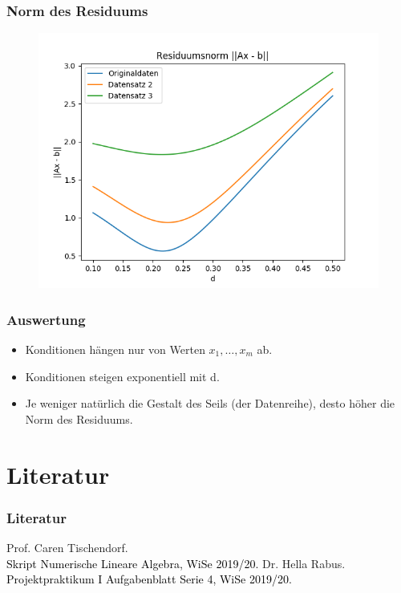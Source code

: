 \documentclass[a4paper, 11pt]{beamer}
\begin{document}
\begin{frame}
    \frametitle{Norm des Residuums}

    \begin{figure}
        \centering
        \includegraphics[scale=0.6]{residuumsnorm}
    \end{figure}
\end{frame}


\begin{frame}
    \frametitle{Auswertung}

    \begin{itemize}
        \item Konditionen hängen nur von Werten $x_1,\hdots,x_m$ ab.
        \item Konditionen steigen exponentiell mit d.
        \item Je weniger natürlich die Gestalt des Seils (der Datenreihe), desto höher die Norm des Residuums.
    \end{itemize}
\end{frame}


\section{Literatur}

\begin{frame}
    \frametitle{Literatur}

    \begin{thebibliography}{2}
            Prof. Caren Tischendorf.\\
            \textcolor{black}{Skript Numerische Lineare Algebra, WiSe 2019/20.}
            Dr. Hella Rabus.\\
            \textcolor{black}{Projektpraktikum I Aufgabenblatt Serie 4, WiSe 2019/20.}
    \end{thebibliography}
\end{frame}
\end{document}
